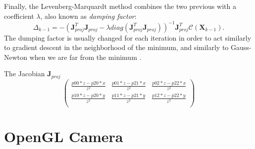 Finally, the Levenberg-Marquardt method combines the two previous with a coefficient $\lambda$, also known as \emph{damping factor}:
\begin{equation}
  \label{eq:l-m}
 \Delta_{k-1} = - (\mathbf{J}_{proj}^T\mathbf{J}_{proj} - \lambda diag(\mathbf{J}_{proj}^T \mathbf{J}_{proj}))^{-1}\mathbf{J}_{proj}^T \mathcal{C}(\mathbf{X}_{k-1}).
\end{equation}
The dumping factor is usually changed for each iteration in order to act similarly to gradient descent in the neighborhood of the minimum, and similarly to Gauss-Newton when we are far from the minimum \cite{Lo05}.

The Jacobian $\mathbf{J}_{proj}$ 
\begin{equation}
  \begin{pmatrix}
   \frac{p00 * z - p20 * x}{z^2} & \frac{p01 * z - p21 * x}{z^2} & \frac{p02 * z - p22 * x}{z^2}\\
   \frac{p10 * z - p20 * y}{z^2} & \frac{p11 * z - p21 * y}{z^2} & \frac{p12 * z - p22 * y}{z^2}\\
  \end{pmatrix}
\end{equation}


\section{OpenGL Camera}
